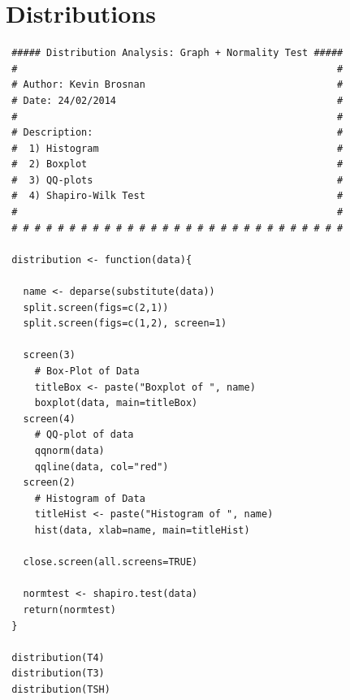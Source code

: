 \documentclass[12pt,a4paper]{report}
\begin{document}
\section{Distributions}\label{App:Distributions}
\begin{lstlisting}
 ##### Distribution Analysis: Graph + Normality Test #####
 #                                                       #
 # Author: Kevin Brosnan                                 #
 # Date: 24/02/2014                                      #
 #                                                       #
 # Description:                                          #
 #  1) Histogram                                         #
 #  2) Boxplot                                           #
 #  3) QQ-plots                                          #
 #  4) Shapiro-Wilk Test                                 #
 #                                                       #
 # # # # # # # # # # # # # # # # # # # # # # # # # # # # #

 distribution <- function(data){

   name <- deparse(substitute(data))
   split.screen(figs=c(2,1))
   split.screen(figs=c(1,2), screen=1)

   screen(3)
     # Box-Plot of Data
     titleBox <- paste("Boxplot of ", name)
     boxplot(data, main=titleBox)
   screen(4)
     # QQ-plot of data
     qqnorm(data)
     qqline(data, col="red")
   screen(2)
     # Histogram of Data
     titleHist <- paste("Histogram of ", name)
     hist(data, xlab=name, main=titleHist)

   close.screen(all.screens=TRUE)

   normtest <- shapiro.test(data)
   return(normtest)
 }

 distribution(T4)
 distribution(T3)
 distribution(TSH)
\end{lstlisting}
\end{document}

